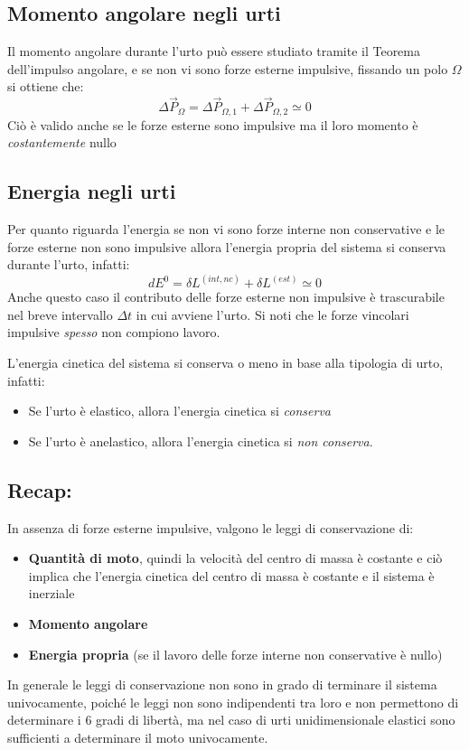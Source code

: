 \documentclass[11pt, a4paper, openright]{book}
\theoremstyle{plain}
\theoremstyle{definition}
\begin{document}
\subsection{Momento angolare negli urti}
Il momento angolare durante l'urto può essere studiato tramite il Teorema dell'impulso angolare, e se non vi sono forze esterne impulsive, fissando un polo $\Omega$ si ottiene che:
\begin{equation}
    \Delta\vec{P}_\Omega = \Delta\vec{P}_{\Omega, 1} + \Delta\vec{P}_{\Omega, 2} \simeq 0
\end{equation}
Ciò è valido anche se le forze esterne sono impulsive ma il loro momento è \textit{costantemente} nullo

\subsection{Energia negli urti}
Per quanto riguarda l'energia se non vi sono forze interne non conservative e le forze esterne non sono impulsive allora l'energia propria del sistema si conserva durante l'urto, infatti:
\begin{equation}
    dE^0 = \delta L^{(int, nc)} + \delta L^{(est)} \simeq 0
\end{equation}
Anche questo caso il contributo delle forze esterne non impulsive è trascurabile nel breve intervallo $\Delta t$ in cui avviene l'urto.
Si noti che le forze vincolari impulsive \textit{spesso} non compiono lavoro.

L'energia cinetica del sistema si conserva o meno in base alla tipologia di urto, infatti:
\begin{itemize}
    \item Se l'urto è elastico, allora l'energia cinetica si \textit{conserva}
    \item Se l'urto è anelastico, allora l'energia cinetica si \textit{non conserva}.
\end{itemize}

\subsection{Recap:}
In assenza di forze esterne impulsive, valgono le leggi di conservazione di:
\begin{itemize}
    \item \textbf{Quantità di moto}, quindi la velocità del centro di massa è costante e ciò implica che l'energia cinetica del centro di massa è costante e il sistema è inerziale
    \item \textbf{Momento angolare}
    \item \textbf{Energia propria} (se il lavoro delle forze interne non conservative è nullo)
\end{itemize}
In generale le leggi di conservazione non sono in grado di terminare il sistema univocamente, poiché le leggi non sono indipendenti tra loro e non permettono di determinare i 6 gradi di libertà, ma nel caso di urti unidimensionale elastici sono sufficienti a determinare il moto univocamente.
\end{document}
